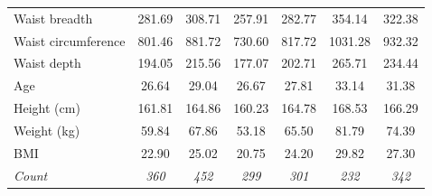 \documentclass[12pt,a4paper,openany,UKenglish]{scrreprt}
\begin{document}
\begin{table}[H]
\begin{tabular}{lcccccc}
		Waist breadth                & 281.69                               & 308.71       & 257.91       & 282.77       & 354.14       & 322.38       \\
		Waist circumference          & 801.46                               & 881.72       & 730.60       & 817.72       & 1031.28      & 932.32       \\
		Waist depth                  & 194.05                               & 215.56       & 177.07       & 202.71       & 265.71       & 234.44       \\
		\hline
		Age                          & 26.64                                & 29.04        & 26.67        & 27.81        & 33.14        & 31.38        \\
		Height (cm)                  & 161.81                               & 164.86       & 160.23       & 164.78       & 168.53       & 166.29       \\
		Weight (kg)                  & 59.84                                & 67.86        & 53.18        & 65.50        & 81.79        & 74.39        \\
		BMI                          & 22.90                                & 25.02        & 20.75        & 24.20        & 29.82        & 27.30        \\
		\hline
		\textit{Count}               & \textit{360}                         & \textit{452} & \textit{299} & \textit{301} & \textit{232} & \textit{342}
	\end{tabular}
\end{table}
\end{document}
